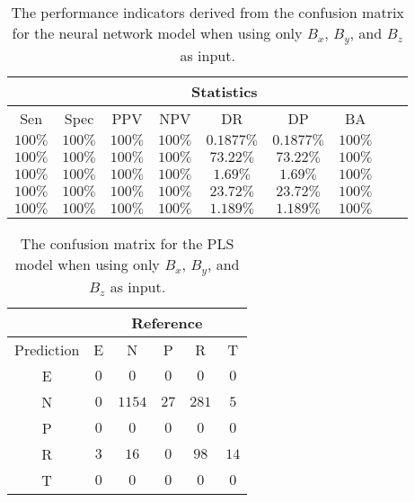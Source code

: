 \begin{table}[!ht]
	\centering
	\begin{tabular}{|c|c|c|c|c|c|c|c|c|}
		\hline
		 & \multicolumn{7}{c|}{Statistics} \\ \hline
		Sen & Spec & PPV & NPV & DR & DP & BA \\ \hline
		$100\%$ & $100\%$ & $100\%$ & $100\%$ & $0.1877\%$ & $0.1877\%$ & $100\%$ \\ \hline
		$100\%$ & $100\%$ & $100\%$ & $100\%$ & $73.22\%$ & $73.22\%$ & $100\%$ \\ \hline
		$100\%$ & $100\%$ & $100\%$ & $100\%$ & $1.69\%$ & $1.69\%$ & $100\%$ \\ \hline
		$100\%$ & $100\%$ & $100\%$ & $100\%$ & $23.72\%$ & $23.72\%$ & $100\%$ \\ \hline
		$100\%$ & $100\%$ & $100\%$ & $100\%$ & $1.189\%$ & $1.189\%$ & $100\%$ \\ \hline
	\end{tabular}
	\caption{The performance indicators derived from the confusion matrix for the neural network model when using only $B_{x}$, $B_{y}$, and $B_{z}$ as input.}
	\label{tab:cs:coord:nnet}
\end{table}

\begin{table}[!ht]
	\centering
	\begin{tabular}{|c|c|c|c|c|c|}
		\hline
		 & \multicolumn{5}{|c|}{Reference} \\ \hline
		 Prediction & E & N & P & R & T \\ \hline
		 E & $0$ & $0$ & $0$ & $0$ & $0$ \\ \hline
		 N & $0$ & $1154$ & $27$ & $281$ & $5$ \\ \hline
		 P & $0$ & $0$ & $0$ & $0$ & $0$ \\ \hline
		 R & $3$ & $16$ & $0$ & $98$ & $14$ \\ \hline
		 T & $0$ & $0$ & $0$ & $0$ & $0$ \\ \hline
	\end{tabular}
	\caption{The confusion matrix for the PLS model when using only $B_{x}$, $B_{y}$, and $B_{z}$ as input.}
	\label{tab:cm:coord:pls}
\end{table}


